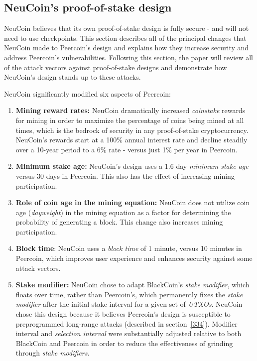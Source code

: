 \documentclass[a4paper,11pt]{article}
\begin{document}
\newpage
\subsection{NeuCoin's proof-of-stake design}
\label{32}

NeuCoin believes that its own proof-of-stake design is fully secure - and will not need to use checkpoints. This section describes all of the principal changes that NeuCoin made to Peercoin's design and explains how they increase security and address Peercoin's vulnerabilities. Following this section, the paper will review all of the attack vectors against proof-of-stake designs and demonstrate how NeuCoin's design stands up to these attacks.

NeuCoin significantly modified six aspects of Peercoin: 

\begin{enumerate}
\setlength{\itemsep}{0pt}
\item{\textbf{Mining reward rates:} NeuCoin dramatically increased \textit{coinstake} rewards for mining in order to maximize the percentage of coins being mined at all times, which is the bedrock of security in any proof-of-stake cryptocurrency. NeuCoin's rewards start at a 100\% annual interest rate and decline steadily over a 10-year period to a 6\% rate - versus just 1\% per year in Peercoin.}
\item{\textbf{Minimum stake age:} NeuCoin's design uses a 1.6 day \textit{minimum stake age} versus 30 days in Peercoin. This also has the effect of increasing mining participation.}
\item{\textbf{Role of coin age in the mining equation:} NeuCoin does not utilize coin age (\textit{dayweight}) in the mining equation as a factor for determining the probability of generating a block. This change also increases mining participation.}
\item{\textbf{Block time}: NeuCoin uses a \textit{block time} of 1 minute, versus 10 minutes in Peercoin, which improves user experience and enhances security against some attack vectors.}
\item{\textbf{Stake modifier:} NeuCoin chose to adapt BlackCoin's \textit{stake modifier}, which floats over time, rather than Peercoin's, which permanently fixes the \textit{stake modifier} after the initial stake interval for a given set of \textit{UTXOs}. NeuCoin chose this design because it believes Peercoin's design is susceptible to preprogrammed long-range attacks (described in section~\ref{334}). Modifier interval and \textit{selection interval} were substantially adjusted relative to both BlackCoin and Peercoin in order to reduce the effectiveness of grinding through \textit{stake modifiers}.}

\end{enumerate}
\end{document}
